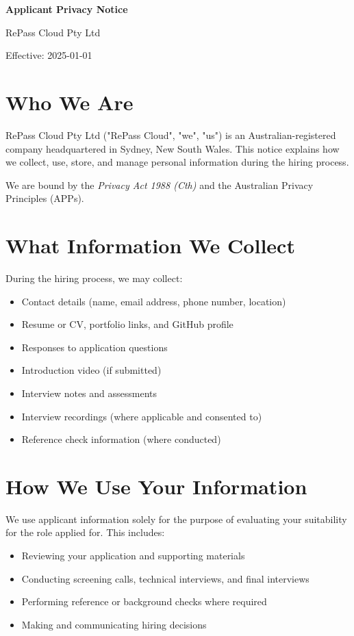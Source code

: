 \documentclass[11pt]{article}
\begin{document}
{\LARGE \textbf{Applicant Privacy Notice}}

\vspace{4pt}
RePass Cloud Pty Ltd

\vspace{2pt}
Effective: 2025-01-01

\vspace{12pt}

\section{Who We Are}

RePass Cloud Pty Ltd ("RePass Cloud", "we", "us") is an Australian-registered company headquartered in Sydney, New South Wales. This notice explains how we collect, use, store, and manage personal information during the hiring process.

We are bound by the \textit{Privacy Act 1988 (Cth)} and the Australian Privacy Principles (APPs).

\section{What Information We Collect}

During the hiring process, we may collect:

\begin{itemize}
\item Contact details (name, email address, phone number, location)
\item Resume or CV, portfolio links, and GitHub profile
\item Responses to application questions
\item Introduction video (if submitted)
\item Interview notes and assessments
\item Interview recordings (where applicable and consented to)
\item Reference check information (where conducted)
\end{itemize}

\section{How We Use Your Information}

We use applicant information solely for the purpose of evaluating your suitability for the role applied for. This includes:

\begin{itemize}
\item Reviewing your application and supporting materials
\item Conducting screening calls, technical interviews, and final interviews
\item Performing reference or background checks where required
\item Making and communicating hiring decisions
\end{itemize}
\end{document}

